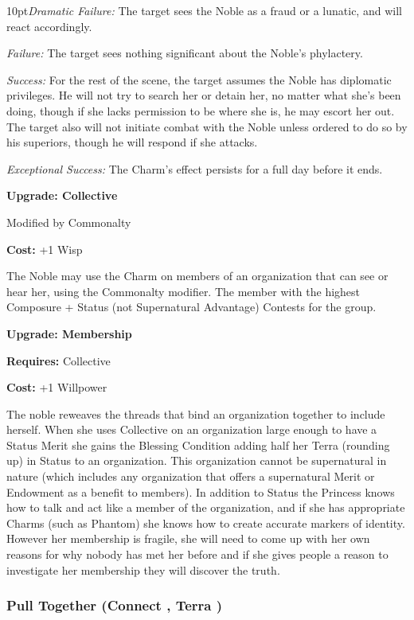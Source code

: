     \begin{myindentpar}{10pt}\emph{Dramatic Failure:} The target sees the Noble as a fraud or a lunatic, and will react accordingly.

    \emph{Failure:} The target sees nothing significant about the Noble’s phylactery.

    \emph{Success:}  For the rest of the scene, the target assumes the Noble has diplomatic privileges. He will not try to search her or detain her, no matter what she’s been doing, though if she lacks permission to be where she is, he may escort her out. The target also will not initiate combat with the Noble unless ordered to do so by his superiors, though he will respond if she attacks.

    \emph{Exceptional Success:}  The Charm’s effect persists for a full day before it ends.
	
	\textbf{Upgrade: Collective}

	Modified by Commonalty

	\textbf{Cost:} +1 Wisp

	The Noble may use the Charm on members of an organization that can see or hear her, using the Commonalty modifier. The member with the highest Composure + Status (not Supernatural Advantage) Contests for the group.
	
	\textbf{Upgrade: Membership}
	
	\textbf{Requires:} Collective
	
	\textbf{Cost:} +1 Willpower
	
	The noble reweaves the threads that bind an organization together to include herself. When she uses Collective on an organization large enough to have a Status Merit she gains the Blessing Condition adding half her Terra (rounding up) in Status to an organization. This organization cannot be supernatural in nature (which includes any organization that offers a supernatural Merit or Endowment as a benefit to members). In addition to Status the Princess knows how to talk and act like a member of the organization, and if she has appropriate Charms (such as Phantom) she knows how to create accurate markers of identity. However her membership is fragile, she will need to come up with her own reasons for why nobody has met her before and if she gives people a reason to investigate her membership they will discover the truth. 
	\end{myindentpar}
	
\subsubsection*{Pull Together (Connect \textbullet, Terra \textbullet\textbullet)}

